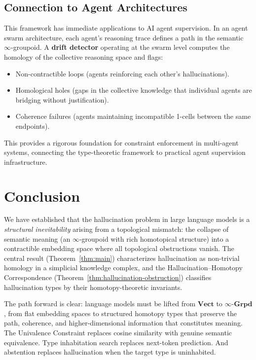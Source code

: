 \documentclass[11pt,a4paper,twocolumn]{article}
\theoremstyle{plain}
\theoremstyle{definition}
\newcommand{\Vect}{\mathbf{Vect}}
\newcommand{\Grpd}{\boldsymbol{\infty}\text{-}\mathbf{Grpd}}
\begin{document}
\subsection{Connection to Agent Architectures}

This framework has immediate applications to AI agent supervision. In an agent swarm architecture, each agent's reasoning trace defines a path in the semantic $\infty$-groupoid. A \textbf{drift detector} operating at the swarm level computes the homology of the collective reasoning space and flags:
\begin{itemize}[nosep]
  \item Non-contractible loops (agents reinforcing each other's hallucinations).
  \item Homological holes (gaps in the collective knowledge that individual agents are bridging without justification).
  \item Coherence failures (agents maintaining incompatible 1-cells between the same endpoints).
\end{itemize}
This provides a rigorous foundation for constraint enforcement in multi-agent systems, connecting the type-theoretic framework to practical agent supervision infrastructure.

\section{Conclusion}\label{sec:conclusion}

We have established that the hallucination problem in large language models is a \emph{structural inevitability} arising from a topological mismatch: the collapse of semantic meaning (an $\infty$-groupoid with rich homotopical structure) into a contractible embedding space where all topological obstructions vanish. The central result (Theorem~\ref{thm:main}) characterizes hallucination as non-trivial homology in a simplicial knowledge complex, and the Hallucination--Homotopy Correspondence (Theorem~\ref{thm:hallucination-obstruction}) classifies hallucination types by their homotopy-theoretic invariants.

The path forward is clear: language models must be lifted from $\Vect$ to $\Grpd$, from flat embedding spaces to structured homotopy types that preserve the path, coherence, and higher-dimensional information that constitutes meaning. The Univalence Constraint replaces cosine similarity with genuine semantic equivalence. Type inhabitation search replaces next-token prediction. And abstention replaces hallucination when the target type is uninhabited.
\end{document}
